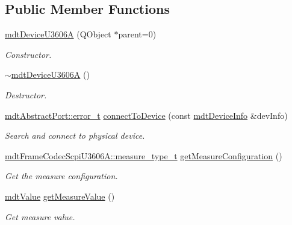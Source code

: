 \subsection*{Public Member Functions}
\begin{DoxyCompactItemize}
\item 
\hyperlink{classmdt_device_u3606_a_a91201ae14df7b553a947b5857eaa1c65}{mdtDeviceU3606A} (QObject $\ast$parent=0)
\begin{DoxyCompactList}\small\item\em Constructor. \end{DoxyCompactList}\item 
\hypertarget{classmdt_device_u3606_a_a7d2fb26475e72cce95ca6be384d569b7}{
\hyperlink{classmdt_device_u3606_a_a7d2fb26475e72cce95ca6be384d569b7}{$\sim$mdtDeviceU3606A} ()}
\label{classmdt_device_u3606_a_a7d2fb26475e72cce95ca6be384d569b7}

\begin{DoxyCompactList}\small\item\em Destructor. \end{DoxyCompactList}\item 
\hyperlink{classmdt_abstract_port_ad4121bb930c95887e77f8bafa065a85e}{mdtAbstractPort::error\_\-t} \hyperlink{classmdt_device_u3606_a_acf3b48b13bc179ad4f94b3011b7d607a}{connectToDevice} (const \hyperlink{classmdt_device_info}{mdtDeviceInfo} \&devInfo)
\begin{DoxyCompactList}\small\item\em Search and connect to physical device. \end{DoxyCompactList}\item 
\hyperlink{classmdt_frame_codec_scpi_u3606_a_a3d7a1de14d77797a08e3d2991fa9f004}{mdtFrameCodecScpiU3606A::measure\_\-type\_\-t} \hyperlink{classmdt_device_u3606_a_a8732ec3f4a04a191585191e1ba4f190d}{getMeasureConfiguration} ()
\begin{DoxyCompactList}\small\item\em Get the measure configuration. \end{DoxyCompactList}\item 
\hyperlink{classmdt_value}{mdtValue} \hyperlink{classmdt_device_u3606_a_ae75a1a896f905487d080761a2b8cf5a5}{getMeasureValue} ()
\begin{DoxyCompactList}\small\item\em Get measure value. \end{DoxyCompactList}\end{DoxyCompactItemize}


